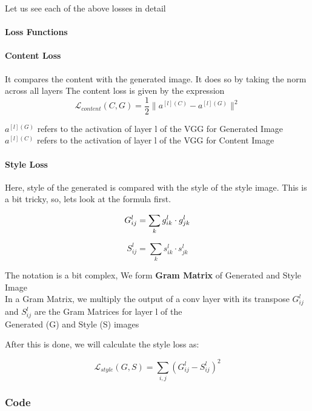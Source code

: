 \documentclass[11pt]{article}
\begin{document}
Let us see each of the above losses in detail

    \hypertarget{loss-functions}{%
\paragraph{Loss Functions}\label{loss-functions}}

    \hypertarget{content-loss}{%
\paragraph{Content Loss}\label{content-loss}}

It compares the content with the generated image. It does so by taking
the norm across all layers The content loss is given by the expression\\
\[
\mathcal{L}_{content} (C,G) = \frac{1}{2} \lVert a^{[l](C)} - a^{[l](G)} \rVert ^{2}
\]

\(a^{[l](G)}\) refers to the activation of layer l of the VGG for
Generated Image\\
\(a^{[l](C)}\) refers to the activation of layer l of the VGG for
Content Image

    \hypertarget{style-loss}{%
\paragraph{Style Loss}\label{style-loss}}
Here, style of the generated is compared with the style of the style
image. This is a bit tricky, so, lets look at the formula first.

\[
 G_{ij}^{l} = \sum_{k} g_{ik}^{l} \cdot  g_{jk}^{l} \\
\]
 
\[
S_{ij}^{l} = \sum_{k} s_{ik}^{l} \cdot  s_{jk}^{l}
\]


The notation is a bit complex, We form \textbf{Gram Matrix} of Generated
and Style Image\\
In a Gram Matrix, we multiply the output of a conv layer with its
transpose \(G_{ij}^{l}\) and \(S_{ij}^{l}\) are the Gram Matrices for
layer l of the\\
Generated (G) and Style (S) images

After this is done, we will calculate the style loss as:

\[
\mathcal{L}_{style}(G,S) = \sum_{i,j} (G_{ij}^{l} - S_{ij}^{l})^{2}
\]
\pagebreak

    \hypertarget{code}{%
\subsubsection{Code}\label{code}}
\end{document}
